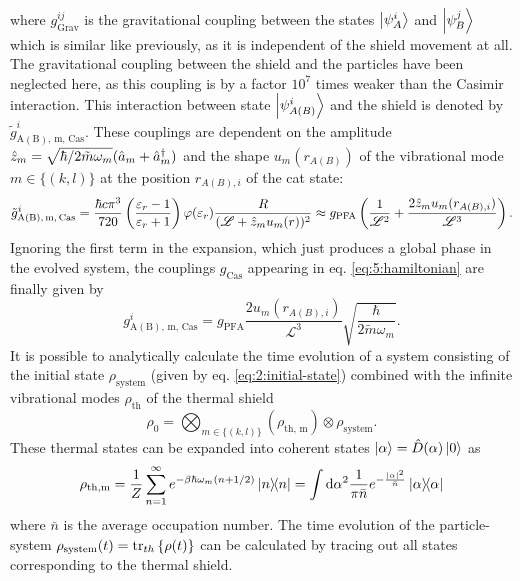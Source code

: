 where $g^{ij}_\mathrm{Grav}$ is the gravitational coupling between the states $\ket{\psi^i_A}$ and $\ket{\psi^j_B}$ which is similar like previously, as it is independent of the shield movement at all.
The gravitational coupling between the shield and the particles have been neglected here, as this coupling is by a factor $10^{7}$ times weaker than the Casimir interaction.
This interaction between state $\ket{\psi_{A(B)}^i}$ and the shield is denoted by $\tilde{g}^i_\mathrm{A(B),\,m,\,Cas}$. These couplings are dependent on the amplitude $\hat{z}_{m} = \sqrt{\hbar/2\tilde{m}\omega_m} (\hat{a}_m + \hat{a}^\dagger_m)$ and the shape $u_{m}(r_{A(B)})$ of the vibrational mode $m\in\{(k,l)\}$ at the position $r_{A(B),i}$ of the cat state:
\begin{equation}
  \tilde{g}^i_\mathrm{A(B),\,m,\,Cas} = \frac{\hbar c \pi^3}{720} \left(\frac{\varepsilon_r - 1}{\varepsilon_r + 1}\right)\varphi(\varepsilon_r) \frac{R}{(\mathscr{L} + \hat{z}_m u_m(r))^2} \approx g_\mathrm{PFA} \left(\frac{1}{\mathscr{L}^2} + \frac{2 \hat{z}_m u_m(r_{A(B),i})}{\mathscr{L}^3}\right) .
\end{equation}
Ignoring the first term in the expansion, which just produces a global phase in the evolved system, the couplings $g_\mathrm{Cas}$ appearing in eq. \eqref{eq:5:hamiltonian} are finally given by
\begin{equation}
  g^i_\mathrm{A(B),\,m,\,Cas} = g_\mathrm{PFA} \frac{2u_m(r_{A(B),i})}{\mathscr{L}^3} \sqrt{\frac{\hbar}{2 \tilde{m} \omega_m}} .
\end{equation}
It is possible to analytically calculate the time evolution of a system consisting of the initial state $\rho_\mathrm{system}$ (given by eq. \eqref{eq:2:initial-state}) combined with the infinite vibrational modes $\rho_\mathrm{th}$ of the thermal shield
\begin{equation}
  \rho_0 = \bigotimes_{m\in\{(k,l)\}} \left(\rho_\mathrm{th,\,m}\right) \otimes \rho_\mathrm{system} .
\end{equation}
These thermal states can be expanded into coherent states $\ket{\alpha} = \hat{D}(\alpha)\ket{0}$ as \cite{Steiner_2024}
\begin{equation}
  \rho_\mathrm{th,m} = \frac{1}{Z} \sum_{n=1}^{\infty} e^{-\beta \hbar \omega_m (n + 1/2)} \ketbra{n} = \int \dd \alpha^2 \frac{1}{\pi \bar{n}} e^{-\frac{\left\lvert\alpha\right\rvert^2}{\bar{n}}} \ketbra{\alpha}
\end{equation}
where $\bar{n}$ is the average occupation number. The time evolution of the particle-system $\rho_\mathrm{system}(t) = \tr_{th}\left\{\rho(t)\right\}$ can be calculated by tracing out all states corresponding to the thermal shield.

